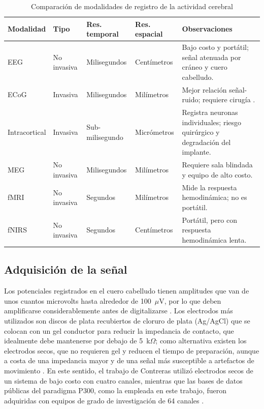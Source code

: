 \begin{table}[htbp]
\centering
\caption{Comparación de modalidades de registro de la actividad cerebral}
\label{tab:modalidades}
\small
\begin{tabularx}{\textwidth}{L{2.2cm}L{1.9cm}L{2.1cm}L{2.1cm}Y}
\toprule
\textbf{Modalidad} & \textbf{Tipo} & \textbf{Res. temporal} & \textbf{Res. espacial} & \textbf{Observaciones} \\
\midrule
EEG & No invasiva & Milisegundos & Centímetros & Bajo costo y portátil; señal atenuada por cráneo y cuero cabelludo. \\
ECoG & Invasiva & Milisegundos & Milímetros & Mejor relación señal-ruido; requiere cirugía \cite{brunner2011}. \\
Intracortical & Invasiva & Sub-milisegundo & Micrómetros & Registra neuronas individuales; riesgo quirúrgico y degradación del implante. \\
MEG & No invasiva & Milisegundos & Milímetros & Requiere sala blindada y equipo de alto costo. \\
fMRI & No invasiva & Segundos & Milímetros & Mide la respuesta hemodinámica; no es portátil. \\
fNIRS & No invasiva & Segundos & Centímetros & Portátil, pero con respuesta hemodinámica lenta. \\
\bottomrule
\end{tabularx}
\par{}
\end{table}

\subsection{Adquisición de la señal}

Los potenciales registrados en el cuero cabelludo tienen amplitudes que van de unos cuantos
microvolts hasta alrededor de 100~$\mu$V, por lo que deben amplificarse considerablemente antes
de digitalizarse \cite{sanei2007}. Los electrodos más utilizados son discos de plata recubiertos de
cloruro de plata (Ag/AgCl) que se colocan con un gel conductor para reducir la impedancia de
contacto, que idealmente debe mantenerse por debajo de 5~k$\Omega$; como alternativa existen los
electrodos secos, que no requieren gel y reducen el tiempo de preparación, aunque a costa de una
impedancia mayor y de una señal más susceptible a artefactos de movimiento
\cite{niedermeyer2005}. En este sentido, el trabajo de Contreras \cite{contreras2021} utilizó
electrodos secos de un sistema de bajo costo con cuatro canales, mientras que las bases de datos
públicas del paradigma P300, como la empleada en este trabajo, fueron adquiridas con equipos de
grado de investigación de 64 canales \cite{blankertz2006}.

